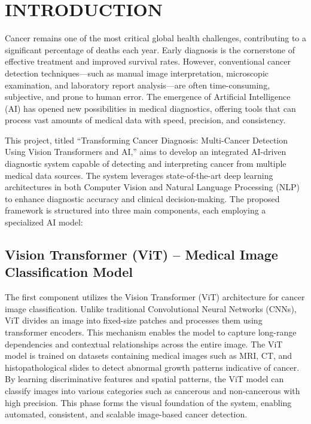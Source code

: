 \documentclass[a4paper,12pt]{report}
\begin{document}
\chapter{INTRODUCTION}
\label{chap:introduction}
\begin{doublespace}
\vspace{0.2cm}

{\fontsize{12pt}{18pt}\selectfont

Cancer remains one of the most critical global health challenges, contributing to a significant percentage of deaths each year. Early diagnosis is the cornerstone of effective treatment and improved survival rates. However, conventional cancer detection techniques—such as manual image interpretation, microscopic examination, and laboratory report analysis—are often time-consuming, subjective, and prone to human error. The emergence of Artificial Intelligence (AI) has opened new possibilities in medical diagnostics, offering tools that can process vast amounts of medical data with speed, precision, and consistency.

This project, titled “Transforming Cancer Diagnosis: Multi-Cancer Detection Using Vision Transformers and AI,” aims to develop an integrated AI-driven diagnostic system capable of detecting and interpreting cancer from multiple medical data sources. The system leverages state-of-the-art deep learning architectures in both Computer Vision and Natural Language Processing (NLP) to enhance diagnostic accuracy and clinical decision-making. The proposed framework is structured into three main components, each employing a specialized AI model:


}

\vspace{0.2cm}
\section{Vision Transformer (ViT) – Medical Image Classification Model}
\label{sec:1.1}
\vspace{0.2cm}

{\fontsize{12pt}{18pt}\selectfont
The first component utilizes the Vision Transformer (ViT) architecture for cancer image classification. Unlike traditional Convolutional Neural Networks (CNNs), ViT divides an image into fixed-size patches and processes them using transformer encoders. This mechanism enables the model to capture long-range dependencies and contextual relationships across the entire image. The ViT model is trained on datasets containing medical images such as MRI, CT, and histopathological slides to detect abnormal growth patterns indicative of cancer. By learning discriminative features and spatial patterns, the ViT model can classify images into various categories such as cancerous and non-cancerous with high precision. This phase forms the visual foundation of the system, enabling automated, consistent, and scalable image-based cancer detection.
}



\end{doublespace}
\end{document}
